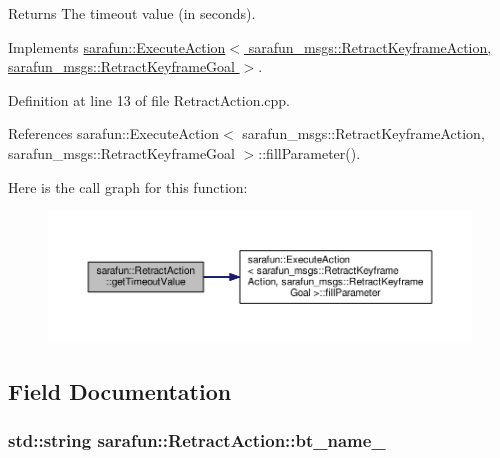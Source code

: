 \begin{DoxyReturn}{Returns}
The timeout value (in seconds). 
\end{DoxyReturn}


Implements \hyperlink{classsarafun_1_1ExecuteAction_aba6cfa8a8ce19e735eb6394424df6d17_aba6cfa8a8ce19e735eb6394424df6d17}{sarafun\-::\-Execute\-Action$<$ sarafun\-\_\-msgs\-::\-Retract\-Keyframe\-Action, sarafun\-\_\-msgs\-::\-Retract\-Keyframe\-Goal $>$}.



Definition at line 13 of file Retract\-Action.\-cpp.



References sarafun\-::\-Execute\-Action$<$ sarafun\-\_\-msgs\-::\-Retract\-Keyframe\-Action, sarafun\-\_\-msgs\-::\-Retract\-Keyframe\-Goal $>$\-::fill\-Parameter().



Here is the call graph for this function\-:
\nopagebreak
\begin{figure}[H]
\begin{center}
\leavevmode
\includegraphics[width=350pt]{d4/dd3/classsarafun_1_1RetractAction_af95bb8d3826dbe1444a8a3e12d8596b0_af95bb8d3826dbe1444a8a3e12d8596b0_cgraph}
\end{center}
\end{figure}




\subsection{Field Documentation}
\hypertarget{classsarafun_1_1RetractAction_a186b48e8f63ea5e0cd8c8047cfa36843_a186b48e8f63ea5e0cd8c8047cfa36843}{
\subsubsection[{bt\-\_\-name\-\_\-}]{\setlength{\rightskip}{0pt plus 5cm}std\-::string sarafun\-::\-Retract\-Action\-::bt\-\_\-name\-\_\-\hspace{0.3cm}{\ttfamily [private]}}}\label{classsarafun_1_1RetractAction_a186b48e8f63ea5e0cd8c8047cfa36843_a186b48e8f63ea5e0cd8c8047cfa36843}


